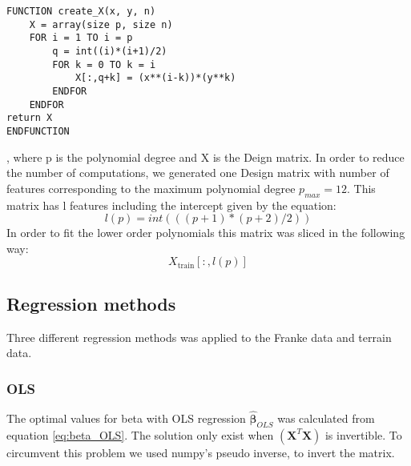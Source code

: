 \begin{lstlisting}
FUNCTION create_X(x, y, n)
	X = array(size p, size n)
	FOR i = 1 TO i = p
		q = int((i)*(i+1)/2)
		FOR k = 0 TO k = i
			X[:,q+k] = (x**(i-k))*(y**k)
		ENDFOR
	ENDFOR
return X
ENDFUNCTION
\end{lstlisting}

, where p is the polynomial degree and X is the Deign matrix. 
In order to reduce the number of computations, we generated one Design matrix
with number of features corresponding to the maximum polynomial degree $p_{max}
= 12$. This matrix has l features including the intercept given by the
equation: 
\begin{equation*}
        l(p) = int(((p+1)*(p+2)/2))		
\end{equation*}
In order to fit the lower order polynomials this matrix was sliced in the
following way:
\begin{equation*}
    X_{\text{train}}[:,l(p)] 
\end{equation*}

  




\subsection{Regression methods}
Three different regression methods was applied to the Franke data and terrain
data.  
\subsubsection{OLS}
The optimal values for beta with OLS regression $\hat{\bm{\beta}  }_{OLS}$ was
calculated from equation
\eqref{eq:beta_OLS}. The solution only exist when $(\bm{X}^T \bm{X})$ is
invertible. To circumvent this problem we used numpy's pseudo inverse, to invert
the matrix.

